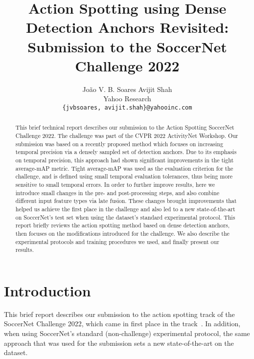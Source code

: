 \documentclass[10pt,twocolumn,letterpaper]{article}
\begin{document}
\title{Action Spotting using Dense Detection Anchors Revisited: Submission to the SoccerNet Challenge 2022}

\author{João V. B. Soares \qquad Avijit Shah\\
Yahoo Research\\
{\tt\small \{jvbsoares, avijit.shah\}@yahooinc.com}
}
\maketitle

\begin{abstract}
   This brief technical report describes our submission to the Action Spotting SoccerNet Challenge 2022. The challenge was part of the CVPR 2022 ActivityNet Workshop. Our submission was based on a recently proposed method which focuses on increasing temporal precision via a densely sampled set of detection anchors.
Due to its emphasis on temporal precision, this approach had shown significant improvements in the tight average-mAP metric. Tight average-mAP was used as the evaluation criterion for the challenge, and is defined using small temporal evaluation tolerances, thus being more sensitive to small temporal errors.
In order to further improve results, here we introduce small changes in the pre- and post-processing steps, and also combine different input feature types via late fusion. These changes brought improvements that helped us achieve the first place in the challenge and also led to a new state-of-the-art on SoccerNet's test set when using the dataset's standard experimental protocol. This report briefly reviews the action spotting method based on dense detection anchors, then focuses on the modifications introduced for the challenge. We also describe the experimental protocols and training procedures we used, and finally present our results.
\end{abstract}

\section{Introduction}
\label{sec:intro}

This brief report describes our submission to the action spotting track of the SoccerNet Challenge 2022, which came in first place in the track~\cite{mmsports, spottingchallenge}. In addition, when using SoccerNet's standard (non-challenge) experimental protocol, the same approach that was used for the submission sets a new state-of-the-art on the dataset.
\end{document}
